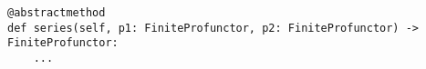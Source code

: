 \par\begin{minipage}{81ex}
\begin{verbatim}
@abstractmethod
def series(self, p1: FiniteProfunctor, p2: FiniteProfunctor) -> FiniteProfunctor:
    ...
\end{verbatim}
\end{minipage}\par